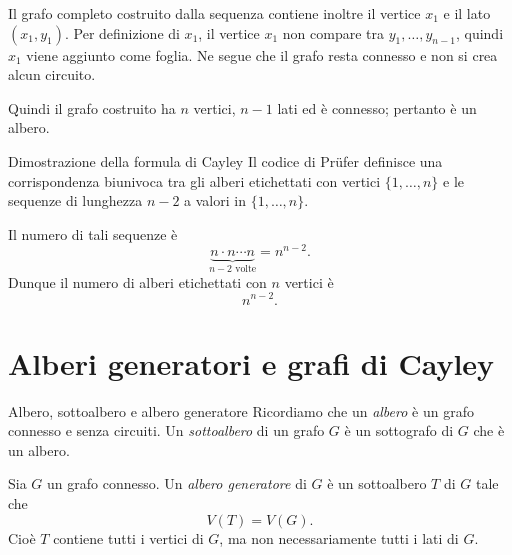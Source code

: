\documentclass[a4paper]{article}
\begin{document}
\begin{snippetproof}{}
    Il grafo completo costruito dalla sequenza contiene inoltre il vertice \(x_1\) e il lato \((x_1,y_1)\). Per definizione di \(x_1\), il vertice \(x_1\) non compare tra \(y_1,\ldots,y_{n-1}\), quindi \(x_1\) viene aggiunto come foglia. Ne segue che il grafo resta connesso e non si crea alcun circuito.

    Quindi il grafo costruito ha \(n\) vertici, \(n-1\) lati ed è connesso; pertanto è un albero.
\end{snippetproof}

\begin{snippetproof}{Dimostrazione della formula di Cayley}
    Il codice di Prüfer definisce una corrispondenza biunivoca tra gli alberi etichettati con vertici \(\{1,\ldots,n\}\) e le sequenze di lunghezza \(n-2\) a valori in \(\{1,\ldots,n\}\).

    Il numero di tali sequenze è
    \[
        \underbrace{n\cdot n\cdots n}_{n-2\text{ volte}}=n^{n-2}.
    \]
    Dunque il numero di alberi etichettati con \(n\) vertici è
    \[
        n^{n-2}.
    \]
\end{snippetproof}

\section{Alberi generatori e grafi di Cayley}

\begin{snippetdefinition}{Albero, sottoalbero e albero generatore}
    Ricordiamo che un \emph{albero} è un grafo connesso e senza circuiti. Un \emph{sottoalbero} di un grafo \(G\) è un sottografo di \(G\) che è un albero.

    Sia \(G\) un grafo connesso. Un \emph{albero generatore} di \(G\) è un sottoalbero \(T\) di \(G\) tale che
    \[
        V(T)=V(G).
    \]
    Cioè \(T\) contiene tutti i vertici di \(G\), ma non necessariamente tutti i lati di \(G\).
\end{snippetdefinition}
\end{document}
